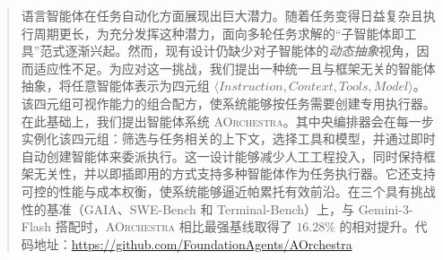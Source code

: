 \begin{abstract}
语言智能体在任务自动化方面展现出巨大潜力。随着任务变得日益复杂且执行周期更长，为充分发挥这种潜力，面向多轮任务求解的“子智能体即工具”范式逐渐兴起。然而，现有设计仍缺少对子智能体的\emph{动态抽象}视角，因而适应性不足。为应对这一挑战，我们提出一种统一且与框架无关的智能体抽象，将任意智能体表示为四元组 $\langle Instruction, Context, Tools, Model \rangle$。该四元组可视作能力的组合配方，使系统能够按任务需要创建专用执行器。在此基础上，我们提出智能体系统 \textsc{AOrchestra}。其中央编排器会在每一步实例化该四元组：筛选与任务相关的上下文，选择工具和模型，并通过即时自动创建智能体来委派执行。这一设计能够减少人工工程投入，同时保持框架无关性，并以即插即用的方式支持多种智能体作为任务执行器。它还支持可控的性能与成本权衡，使系统能够逼近帕累托有效前沿。在三个具有挑战性的基准（GAIA、SWE-Bench 和 Terminal-Bench）上，与 Gemini-3-Flash 搭配时，\textsc{AOrchestra} 相比最强基线取得了 $16.28\%$ 的相对提升。代码地址：\url{https://github.com/FoundationAgents/AOrchestra}
\end{abstract}

